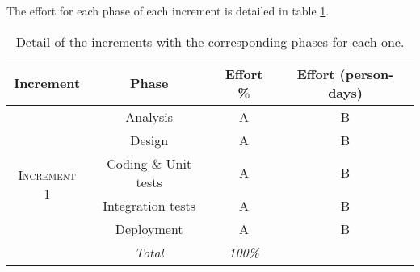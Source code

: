 The effort for each phase of each increment is detailed in table \ref{tblIncrementPhases}.

\begin{table}[hbtp]
\centering
\begin{tabular}{|c|c|c|c|}
\hline
\textbf{Increment} & \textbf{Phase} & \textbf{Effort \%} & \textbf{Effort (person-days)} \\ \hline

\multirow{6}{*}{\textsc{Increment 1}} & Analysis & A & B \\ \cline{2-4}
& Design & A & B \\ \cline{2-4}
& Coding \& Unit tests & A & B \\ \cline{2-4}
& Integration tests & A & B \\ \cline{2-4}
& Deployment & A & B \\ \cline{2-4}
& \textit{Total} & \textit{100\%} & \textit{} \\ \hline

\end{tabular}
\caption{Detail of the increments with the corresponding phases for each one.}
\label{tblIncrementPhases}
\end{table}
